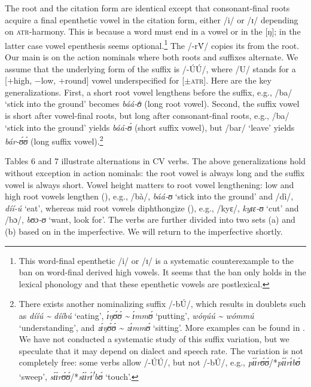 \documentclass[output=paper,newtxmath,modfonts,nonflat,draftmode]{langsci/langscibook}
\begin{document}
\textup{The root and} \textup{the citation form are identical except that consonant-final roots acquire a final epenthetic vowel in the citation form, either /i/ or /ɪ/ depending on \textsc{atr}-harmony. This is because a  word must end in a vowel or in the  [ŋ]; in the latter case vowel epenthesis seems optional.}\footnote{This word-final epenthetic /i/ or /ɪ/ is a systematic counterexample to the ban on word-final derived high vowels. It seems that the ban only holds in the lexical phonology and that these epenthetic vowels are postlexical.} \textup{The  /-r\'{V}/ copies its  from the root. Our main  is on the action nominals where} \textup{both roots and suffixes alternate. We assume that the underlying form of the suffix is /-ÚÚ/}\textup{, where /U/ stands for a [+high, $-$low, +round] vowel underspecified for [$\pm$}\textsc{atr}\textup{]. Here are the key generalizations. First, a short root vowel lengthens before the suffix, e.g., /ba/ ‘stick into the ground’ becomes} \textit{báá-ʊ}́ \textup{(long root vowel). Second, the suffix vowel is short after vowel-final roots, but long after consonant-final roots, e.g., /ba/ ‘stick into the ground’ yields} \textit{báá-ʊ́} \textup{(short suffix vowel), but /bar/ ‘leave’ yields} \textit{bár-ʊ́ʊ́} \textup{(long suffix vowel).}\footnote{There exists another nominalizing suffix /-bÚ/, which results in doublets such as \textit{dííú {\textasciitilde} dííbú} ‘eating’, \textit{ɪ́ŋʊ́ʊ́ {\textasciitilde} ɪ́mmʊ́} ‘putting’, \textit{wóŋúú {\textasciitilde} wómmú} ‘understanding’, and \textit{zɪ́ŋʊ́ʊ́ {\textasciitilde} zɪ́mmʊ́} ‘sitting’. More examples can be found in \citet{Durand1953}. We have not conducted a systematic study of this suffix variation, but we speculate that it may depend on dialect and speech rate. The variation is not completely free: some verbs allow /-ÚÚ/, but not /-bÚ/, e.g., \textit{pɪ́ɪ́rʊ́ʊ́}/*\textit{pɪ́ɪ́rɪ́bʊ́} ‘sweep’, \textit{sɪ́ɪ́rʊ́ʊ́}/*\textit{sɪ́ɪ́rɪ́\textsuperscript{!}bʊ́} ‘touch’.}

{Tables 6 and 7 illustrate  alternations in CV verbs. The above generalizations hold without exception in action nominals: the root vowel is always long and the suffix vowel is always short. Vowel height matters to root vowel lengthening: low and high root vowels lengthen (), e.g., /bà/,} {\textit{báá-ʊ}}{ ‘stick into the ground’ and /dì/,} {\textit{díí-ú}}{ ‘eat’, whereas mid root vowels diphthongize (), e.g., /kyɛ/,} {\textit{kyɪɛ-ʊ}}{ ‘cut’ and /bɔ/,} {\textit{bʊɔ-ʊ}}{ ‘want, look for’. The verbs are further divided into two sets (a) and (b) based on  in the imperfective. We will return to the imperfective shortly.}
\end{document}
